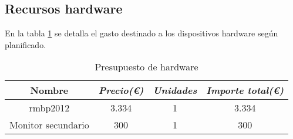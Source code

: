 \subsection{Recursos hardware}

En la tabla \ref{tab:budget-hardware} se detalla el gasto destinado a los dispositivos hardware según planificado.

\begin{table}[htp]
	\centering
	\caption{Presupuesto de hardware}\label{tab:budget-hardware}
	\begin{tabular}{cccc}
		\toprule
    	\textbf{Nombre} & \emph{Precio(\euro)} & \emph{Unidades} & \emph{Importe total(\euro)}\\
    	\midrule
    	\acrshort{rmbp}2012			& 	3.334			&	1 			&	3.334					\\
    	Monitor secundario	&	300				&	1			&	300						\\
    	\bottomrule
    \end{tabular}
\end{table}